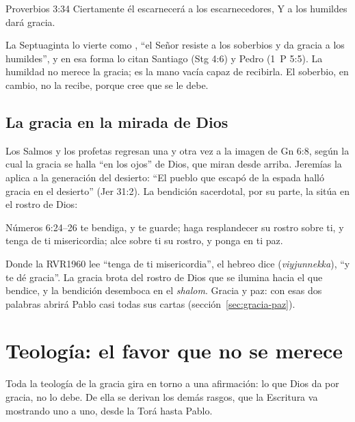 \begin{verso}{Proverbios 3:34}
Ciertamente él escarnecerá a los escarnecedores, Y a los humildes dará gracia.
\end{verso}

La Septuaginta lo vierte como , ``el Señor resiste a los soberbios y da gracia a los humildes'', y en esa forma lo citan Santiago (Stg 4:6) y Pedro (1~P 5:5). La humildad no merece la gracia; es la mano vacía capaz de recibirla. El soberbio, en cambio, no la recibe, porque cree que se le debe.


\subsection{La gracia en la mirada de Dios}
Los Salmos y los profetas regresan una y otra vez a la imagen de Gn 6:8, según la cual la gracia se halla ``en los ojos'' de Dios, que miran desde arriba. Jeremías la aplica a la generación del desierto: ``El pueblo que escapó de la espada halló gracia en el desierto'' (Jer 31:2). La bendición sacerdotal, por su parte, la sitúa en el rostro de Dios:

\begin{verso}{Números 6:24–26}
\SENOR{} te bendiga, y te guarde; \SENOR{} haga resplandecer su rostro sobre ti, y tenga de ti misericordia; \SENOR{} alce sobre ti su rostro, y ponga en ti paz.
\end{verso}

Donde la RVR1960 lee ``tenga de ti misericordia'', el hebreo dice  (\emph{viyjunnekka}), ``y te dé gracia''. La gracia brota del rostro de Dios que se ilumina hacia el que bendice, y la bendición desemboca en el \emph{shalom}. Gracia y paz: con esas dos palabras abrirá Pablo casi todas sus cartas (sección~\ref{sec:gracia-paz}).

\section{Teología: el favor que no se merece}\label{sec:teologia-gracia}

Toda la teología de la gracia gira en torno a una afirmación: lo que Dios da por gracia, no lo debe. De ella se derivan los demás rasgos, que la Escritura va mostrando uno a uno, desde la Torá hasta Pablo.


